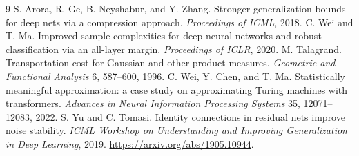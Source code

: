 \documentclass[11pt]{article}
\begin{document}
\clearpage
\appendix














\begin{thebibliography}{9}
S. Arora, R. Ge, B. Neyshabur, and Y. Zhang.
Stronger generalization bounds for deep nets via a compression approach.
\emph{Proceedings of ICML}, 2018.
C. Wei and T. Ma.
Improved sample complexities for deep neural networks and robust classification
via an all-layer margin. \emph{Proceedings of ICLR}, 2020.
M. Talagrand. Transportation cost for Gaussian and other product measures.
\emph{Geometric and Functional Analysis} 6, 587--600, 1996.
C. Wei, Y. Chen, and T. Ma.
Statistically meaningful approximation: a case study on approximating
Turing machines with transformers.
\emph{Advances in Neural Information Processing Systems} 35,
12071--12083, 2022.
S. Yu and C. Tomasi.
Identity connections in residual nets improve noise stability.
\emph{ICML Workshop on Understanding and Improving Generalization
in Deep Learning}, 2019.
\url{https://arxiv.org/abs/1905.10944}.
\end{thebibliography}
\end{document}
